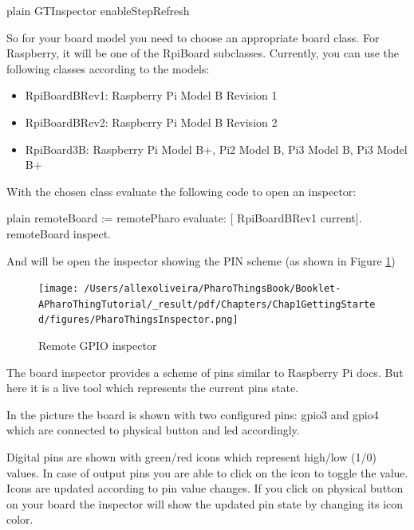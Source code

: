 \documentclass[10pt,twoside,english]{_support/latex/sbabook/sbabook}
\begin{document}
\begin{displaycode}{plain}
GTInspector enableStepRefresh
\end{displaycode}

So for your board model you need to choose an appropriate board class. For Raspberry, it will be one of the RpiBoard subclasses. Currently, you can use the following classes according to the models:

\begin{itemize}
\item RpiBoardBRev1: Raspberry Pi Model B Revision 1
\item RpiBoardBRev2: Raspberry Pi Model B Revision 2
\item RpiBoard3B: Raspberry Pi Model B+, Pi2 Model B, Pi3 Model B, Pi3 Model B+
\end{itemize}

With the chosen class evaluate the following code to open an inspector:

\begin{displaycode}{plain}
remoteBoard := remotePharo evaluate: [ RpiBoardBRev1 current].
remoteBoard inspect.
\end{displaycode}

And will be open the inspector showing the PIN scheme (as shown in Figure \ref{PharoThingsinspector})


\begin{figure}

\begin{center}
\texttt{[image: /Users/allexoliveira/PharoThingsBook/Booklet-APharoThingTutorial/\_result/pdf/Chapters/Chap1GettingStarted/figures/PharoThingsInspector.png]}\caption{Remote GPIO inspector\label{PharoThingsinspector}}\end{center}
\end{figure}


The board inspector provides a scheme of pins similar to Raspberry Pi docs. But here it is a live tool which represents the current pins state.

In the picture the board is shown with two configured pins: gpio3 and gpio4 which are connected to physical button and led accordingly.

Digital pins are shown with green/red icons which represent high/low (1/0) values. In case of output pins you are able to click on the icon to toggle the value. Icons are updated according to pin value changes. If you click on physical button on your board the inspector will show the updated pin state by changing its icon color.
\end{document}
